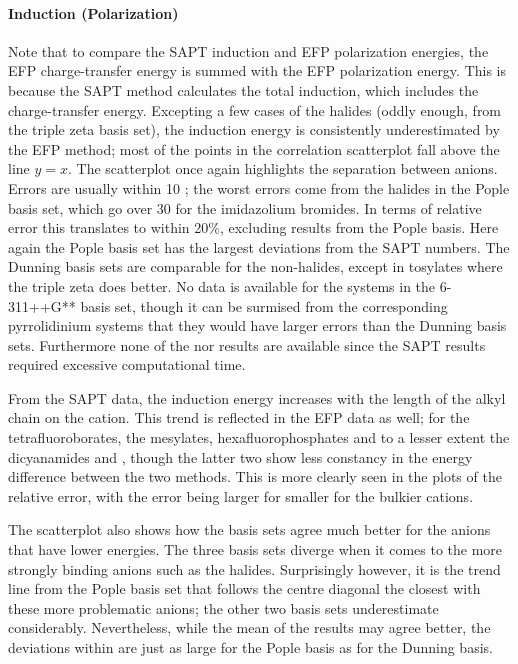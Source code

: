 \begin{multicols}{2}


\paragraph{Induction (Polarization)}
Note that to compare the SAPT induction and EFP polarization energies, the EFP charge-transfer energy is summed with the EFP polarization energy. 
This is because the SAPT method calculates the total induction, which includes the charge-transfer energy.
Excepting a few cases of the halides (oddly enough, from the triple zeta basis set), the induction energy is consistently underestimated by the EFP method; most of the points in the correlation scatterplot fall above the line $ y= x $.
The scatterplot once again highlights the separation between anions.
Errors are usually within 10 \enUnit; the worst errors come from the halides in the Pople basis set, which go over 30 \enUnit for the imidazolium bromides.  
In terms of relative error this translates to within 20\%, excluding results from the Pople basis.
Here again the Pople basis set has the largest deviations from the SAPT numbers. 
The Dunning basis sets are comparable for the non-halides, except in tosylates where the triple zeta does better. 
No data is available for the  systems in the 6-311++G** basis set, though it can be surmised from the corresponding pyrrolidinium systems that they would have larger errors than the Dunning basis sets.
Furthermore none of the  nor  results are available since the SAPT results required excessive computational time.

From the SAPT data, the induction energy increases with the length of the alkyl chain on the cation. 
This trend is reflected in the EFP data as well; for the tetrafluoroborates, the mesylates, hexafluorophosphates and to a lesser extent the dicyanamides and \ntf, though the latter two show less constancy in the energy difference between the two methods.
This is more clearly seen in the plots of the relative error, with the error being larger for smaller for the bulkier cations.

The scatterplot also shows how the basis sets agree much better for the anions that have lower energies.
The three basis sets diverge when it comes to the more strongly binding anions such as the halides.
Surprisingly however, it is the trend line from the Pople basis set that follows the centre diagonal the closest with these more problematic anions; the other two basis sets underestimate considerably.
Nevertheless, while the mean of the results may agree better, the deviations within are just as large for the Pople basis as for the Dunning basis.



\end{multicols}
